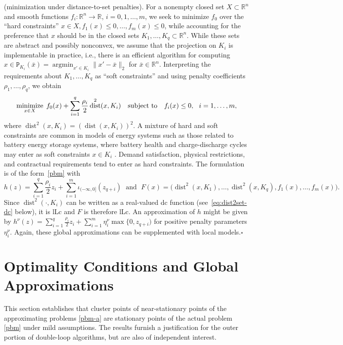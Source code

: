 \documentclass[smallextended,envcountsect]{svjour3}
\newcommand{\argmin}{\operatorname{argmin}}
\newcommand{\fc}[2]{: #1 \rightarrow #2}
\renewcommand{\Re}{\mathbb{R}}
\newcommand{\proj}{\mathtt{P}}
\newcommand{\mybox}{{\hfill $\square$}}
\newcommand{\reals}{\mathbb{R}}
\DeclareMathOperator{\dist}{dist}
\newcommand{\nnmin}{\mathop{\rm minimize}}
\begin{document}
\begin{example}{\rm (minimization under distance-to-set penalties).}\label{example:dist2set}
For a nonempty closed set $X\subset \Re^n$ and smooth functions $f_i\fc{\Re^n}{\Re}$, $i=0, 1, \dots, m$, we seek to minimize $f_0$ over the ``hard constraints'' $x\in X, f_1(x) \leq 0, \dots, f_m(x) \leq 0$, while accounting for the preference that $x$ should be in the closed sets $K_1, \ldots, K_{q}\subset\reals^n$. While these sets are abstract and possibly nonconvex, we assume that the projection on $K_i$ is implementable in practice, i.e., there is an efficient algorithm for computing $x\in \proj_{K_i}(\bar x) = \argmin_{x'\in K_i} \|x'-\bar x\|_2$ for $\bar x\in \reals^n$. Interpreting the requirements about $K_1, \dots, K_q$ as ``soft constraints'' and using penalty coefficients $\rho_1, \dots, \rho_q$, we obtain 
\[
\nnmin_{x \in X} \; f_0(x)+ \sum_{i=1}^{q} \frac{\rho_i}{2} \dist^2(x,K_i)\quad \mbox{subject to}\quad f_i(x) \leq 0,   ~~i=1, \dots, m,
\]
where $\dist^2(x,K_i) = (\dist(x,K_i))^2$. A mixture of hard and soft constraints are common in models of energy systems such as those related to battery energy storage systems, where battery health and charge-discharge cycles may enter as soft constraints $x \in K_i$ \cite{Dhekra_Oliveira_Pflaum_2020}. Demand satisfaction, physical restrictions, and contractual requirements tend to enter as hard constraints. The formulation is of the form~\eqref{pbm} with
\[
h(z)= \sum_{i=1}^{q} \frac{\rho_i}{2} z_i + \sum_{i=1}^m \iota_{(-\infty,0]}(z_{q+i})\;\mbox{ and }\;
F(x)=\big(\dist^2(x,K_1),\ldots,\dist^2(x,K_{q}), f_1(x), \dots, f_m(x)\big).
\]
Since $\dist^2(\cdot,K_i)$ can be written as a real-valued dc function \cite[Proposition 4.13]{WWBook} (see~\eqref{eq:dist2set-dc} below), it is lLc and $F$ is therefore lLc. An approximation of $h$ might be given by $h^\nu(z)= \sum_{i=1}^{q} \frac{\rho_i}{2} z_i + \sum_{i=1}^m \eta_i^\nu \max\{0, z_{q+i})$ for positive penalty parameters $\eta_i^\nu$. Again, these global approximations can be supplemented with local models.\mybox
\end{example}




\section{Optimality Conditions and Global Approximations}\label{sec:global}

This section establishes that cluster points of near-stationary points of the approximating problems \eqref{pbm-a} are stationary points of the actual problem \eqref{pbm} under mild assumptions. The results furnish a justification for the outer portion of double-loop algorithms, but are also of independent interest. 
\end{document}
